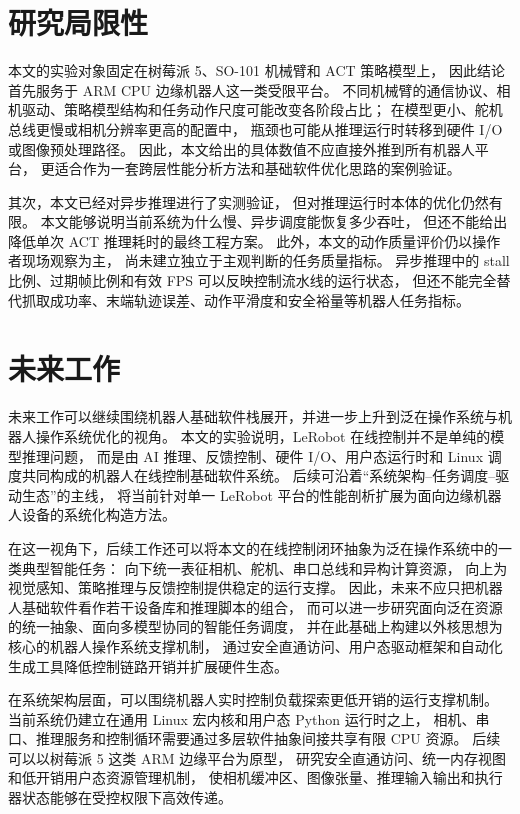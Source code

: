 \begin{conclusion}
\section{研究局限性}

本文的实验对象固定在树莓派 5、SO-101 机械臂和 ACT 策略模型上，
因此结论首先服务于 ARM CPU 边缘机器人这一类受限平台。
不同机械臂的通信协议、相机驱动、策略模型结构和任务动作尺度可能改变各阶段占比；
在模型更小、舵机总线更慢或相机分辨率更高的配置中，
瓶颈也可能从推理运行时转移到硬件 I/O 或图像预处理路径。
因此，本文给出的具体数值不应直接外推到所有机器人平台，
更适合作为一套跨层性能分析方法和基础软件优化思路的案例验证。

其次，本文已经对异步推理进行了实测验证，
但对推理运行时本体的优化仍然有限。
本文能够说明当前系统为什么慢、异步调度能恢复多少吞吐，
但还不能给出降低单次 ACT 推理耗时的最终工程方案。
此外，本文的动作质量评价仍以操作者现场观察为主，
尚未建立独立于主观判断的任务质量指标。
异步推理中的 stall 比例、过期帧比例和有效 FPS 可以反映控制流水线的运行状态，
但还不能完全替代抓取成功率、末端轨迹误差、动作平滑度和安全裕量等机器人任务指标。

\section{未来工作}

未来工作可以继续围绕机器人基础软件栈展开，并进一步上升到泛在操作系统与机器人操作系统优化的视角。
本文的实验说明，LeRobot 在线控制并不是单纯的模型推理问题，
而是由 AI 推理、反馈控制、硬件 I/O、用户态运行时和 Linux 调度共同构成的机器人在线控制基础软件系统。
后续可沿着“系统架构--任务调度--驱动生态”的主线，
将当前针对单一 LeRobot 平台的性能剖析扩展为面向边缘机器人设备的系统化构造方法。

在这一视角下，后续工作还可以将本文的在线控制闭环抽象为泛在操作系统中的一类典型智能任务：
向下统一表征相机、舵机、串口总线和异构计算资源，
向上为视觉感知、策略推理与反馈控制提供稳定的运行支撑。
因此，未来不应只把机器人基础软件看作若干设备库和推理脚本的组合，
而可以进一步研究面向泛在资源的统一抽象、面向多模型协同的智能任务调度，
并在此基础上构建以外核思想为核心的机器人操作系统支撑机制，
通过安全直通访问、用户态驱动框架和自动化生成工具降低控制链路开销并扩展硬件生态。

在系统架构层面，可以围绕机器人实时控制负载探索更低开销的运行支撑机制。
当前系统仍建立在通用 Linux 宏内核和用户态 Python 运行时之上，
相机、串口、推理服务和控制循环需要通过多层软件抽象间接共享有限 CPU 资源。
后续可以以树莓派 5 这类 ARM 边缘平台为原型，
研究安全直通访问、统一内存视图和低开销用户态资源管理机制，
使相机缓冲区、图像张量、推理输入输出和执行器状态能够在受控权限下高效传递。


\end{conclusion}
